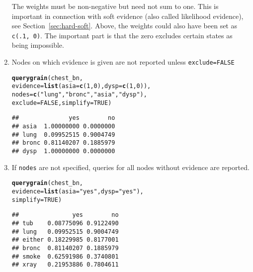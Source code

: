 \documentclass[10pt]{article}\usepackage[]{graphicx}\usepackage[]{xcolor}
\makeatletter
\newcommand{\hlnum}[1]{\textcolor[rgb]{0.686,0.059,0.569}{#1}}%
\newcommand{\hlstr}[1]{\textcolor[rgb]{0.192,0.494,0.8}{#1}}%
\newcommand{\hlstd}[1]{\textcolor[rgb]{0.345,0.345,0.345}{#1}}%
\newcommand{\hlkwc}[1]{\textcolor[rgb]{0.333,0.667,0.333}{#1}}%
\newcommand{\hlkwd}[1]{\textcolor[rgb]{0.737,0.353,0.396}{\textbf{#1}}}%
\newenvironment{kframe}{%
 \def\at@end@of@kframe{}%
 \ifinner\ifhmode%
  \def\at@end@of@kframe{\end{minipage}}%
  \begin{minipage}{\columnwidth}%
 \fi\fi%
 \def\FrameCommand##1{\hskip\@totalleftmargin \hskip-\fboxsep
 \colorbox{shadecolor}{##1}\hskip-\fboxsep
     \hskip-\linewidth \hskip-\@totalleftmargin \hskip\columnwidth}%
 \MakeFramed {\advance\hsize-\width
   \@totalleftmargin\z@ \linewidth\hsize
   \@setminipage}}%
 {\par\unskip\endMakeFramed%
 \at@end@of@kframe}
\newenvironment{knitrout}{}{} %
\def\code#1{{\texttt{#1}}}
\makeatother
\begin{document}
\begin{enumerate}
The weights must be non-negative but need not sum to one. This is
important in connection with soft evidence (also called likelihood
evidence), see Section~\ref{sec:hard-soft}. Above, the weights could
also have been set as \code{c(.1, 0)}. The important part is that the
zero excludes certain states as being impossible.


\item Nodes on which evidence is given are not reported unless \code{exclude=FALSE}

\begin{knitrout}
\color{fgcolor}\begin{kframe}
\begin{alltt}
\hlkwd{querygrain}\hlstd{(chest_bn,}
           \hlkwc{evidence}\hlstd{=}\hlkwd{list}\hlstd{(}\hlkwc{asia}\hlstd{=}\hlkwd{c}\hlstd{(}\hlnum{1}\hlstd{,} \hlnum{0}\hlstd{),} \hlkwc{dysp}\hlstd{=}\hlkwd{c}\hlstd{(}\hlnum{1}\hlstd{,} \hlnum{0}\hlstd{)),}
           \hlkwc{nodes}\hlstd{=}\hlkwd{c}\hlstd{(}\hlstr{"lung"}\hlstd{,} \hlstr{"bronc"}\hlstd{,} \hlstr{"asia"}\hlstd{,} \hlstr{"dysp"}\hlstd{),}
           \hlkwc{exclude}\hlstd{=}\hlnum{FALSE}\hlstd{,} \hlkwc{simplify} \hlstd{=} \hlnum{TRUE}\hlstd{)}
\end{alltt}
\begin{verbatim}
##              yes        no
## asia  1.00000000 0.0000000
## lung  0.09952515 0.9004749
## bronc 0.81140207 0.1885979
## dysp  1.00000000 0.0000000
\end{verbatim}
\end{kframe}
\end{knitrout}


\item If \code{nodes} are not specified, queries for all nodes without evidence are reported.
\begin{knitrout}
\color{fgcolor}\begin{kframe}
\begin{alltt}
\hlkwd{querygrain}\hlstd{(chest_bn,}
           \hlkwc{evidence}\hlstd{=}\hlkwd{list}\hlstd{(}\hlkwc{asia}\hlstd{=}\hlstr{"yes"}\hlstd{,} \hlkwc{dysp}\hlstd{=}\hlstr{"yes"}\hlstd{),}
           \hlkwc{simplify} \hlstd{=} \hlnum{TRUE}\hlstd{)}
\end{alltt}
\begin{verbatim}
##               yes        no
## tub    0.08775096 0.9122490
## lung   0.09952515 0.9004749
## either 0.18229985 0.8177001
## bronc  0.81140207 0.1885979
## smoke  0.62591986 0.3740801
## xray   0.21953886 0.7804611
\end{verbatim}
\end{kframe}
\end{knitrout}


\end{enumerate}
\end{document}
